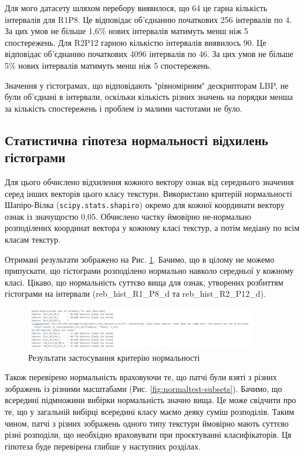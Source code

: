 Для мого датасету шляхом перебору виявилося, що 64 це гарна кількість інтервалів для R1P8. 
Це відповідає об'єднанню початкових 256 інтервалів по 4. 
За цих умов не більше 1,6\% нових інтервалів матимуть менш ніж 5 спостережень.
Для R2P12 гарною кількістю інтервалів виявилось 90. 
Це відповідає об'єднанню початкових 4096 інтервалів по 46. 
За цих умов не більше 5\% нових інтервалів матимуть менш ніж 5 спостережень.

Значення у гістограмах, що відповідають "рівномірним" дескрипторам LBP, не були об'єднані в інтервали, 
оскільки кількість різних значень на порядки менша за кількість спостережень і проблем із малими частотами не було.

\subsection{Статистична гіпотеза нормальності відхилень гістограми}\label{section2.1c1}

Для цього обчислено відхилення кожного вектору ознак від середнього значення серед інших векторів цього класу текстури.
Використано критерій нормальності Шапіро-Вілка (\verb|scipy.stats.shapiro|) окремо для кожної координати вектору ознак із значущостю 0,05.
Обчислено частку ймовірно не-нормально розподілених координат вектора у кожному класі текстур, а потім медіану по всім класам текстур.

Отримані результати зображено на Рис. \ref{fig:normaltest}. 
Бачимо, що в цілому не можемо припускати, що гістограми розподілено нормально навколо середньої у кожному класі.
Цікаво, що нормальність суттєво вища для ознак, утворених розбиттям гістограми на інтервали (reb\_hist\_R1\_P8\_d та reb\_hist\_R2\_P12\_d).

\begin{figure}[h]
    \centering
    \includegraphics[width=0.9\textwidth]{img/normality-test.png}
    \caption{
        Результати застосування критерію нормальності 
    }
    \label{fig:normaltest}
\end{figure}

Також перевірено нормальність враховуючи те, що патчі були взяті з різних зображень із різними масштабами (Рис. \ref{fig:normaltest-subsets}).
Бачимо, що всередині підмножини вибірки нормальність значно вища.
Це може свідчити про те, що у загальній вибірці всередині класу маємо деяку суміш розподілів.
Таким чином, патчі з різних зображень одного типу текстури ймовірно мають суттєво різні розподіли, що необхідно враховувати при проєктуванні класифікаторів.
Ця гіпотеза буде перевірена глибше у наступних розділах.

